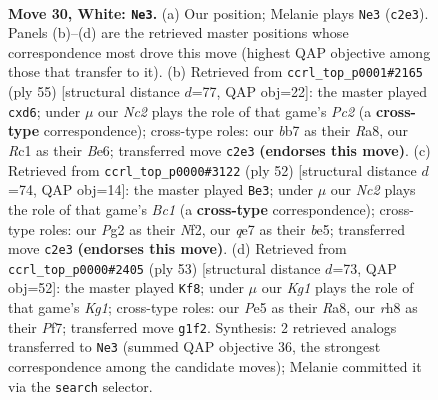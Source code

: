 \documentclass[11pt]{article}
\begin{document}
\clearpage

\begin{figure}[p]\centering
\begin{subfigure}{0.46\textwidth}\centering
\resizebox{\linewidth}{!}{%
\newchessgame
\chessboard[
  setfen={r2k2nr/1b2q3/8/4Pp2/5Q1p/1p1B3P/2N3P1/2R3KR w - - 0 30},
  showmover=false,
  pgfstyle=straightmove, color=movearrow, markmove={c2-e3}
]}
\caption{}
\end{subfigure}\hfill
\begin{subfigure}{0.46\textwidth}\centering
\resizebox{\linewidth}{!}{%
\newchessgame
\chessboard[
  setfen={r4rk1/1pp5/3Pb1p1/1P3nq1/P7/4P2R/1B4B1/1R1Q2K1 b - - 2 28},
  showmover=false,
  pgfstyle=straightmove, color=movearrow, markmove={c7-d6}
]}
\caption{}
\end{subfigure}
\\[4pt]
\begin{subfigure}{0.46\textwidth}\centering
\resizebox{\linewidth}{!}{%
\newchessgame
\chessboard[
  setfen={2b2rk1/3q4/2p3p1/3pb2n/8/2P3P1/Q4NBP/2B2RK1 w - - 0 27},
  showmover=false,
  pgfstyle=straightmove, color=movearrow, markmove={c1-e3}
]}
\caption{}
\end{subfigure}\hfill
\begin{subfigure}{0.46\textwidth}\centering
\resizebox{\linewidth}{!}{%
\newchessgame
\chessboard[
  setfen={r1r3k1/5pp1/3R1b2/qB2pP2/P7/7P/1P4Q1/5R1K b - - 1 27},
  showmover=false,
  pgfstyle=straightmove, color=movearrow, markmove={g8-f8}
]}
\caption{}
\end{subfigure}
\caption{\textbf{Move 30, White: \texttt{Ne3}.} (a) Our position; Melanie plays \texttt{Ne3} (\texttt{c2e3}). Panels (b)--(d) are the retrieved master positions whose correspondence most drove this move (highest QAP objective among those that transfer to it). (b) Retrieved from \texttt{ccrl\_top\_p0001\#2165} (ply 55) [structural distance $d$=77, QAP obj=22]: the master played \texttt{cxd6}; under $\mu$ our \emph{Nc2} plays the role of that game's \emph{Pc2} (a \textbf{cross-type} correspondence); cross-type roles: our \emph{b}b7 as their \emph{R}a8, our \emph{R}c1 as their \emph{B}e6; transferred move \texttt{c2e3} \textbf{(endorses this move)}. (c) Retrieved from \texttt{ccrl\_top\_p0000\#3122} (ply 52) [structural distance $d$=74, QAP obj=14]: the master played \texttt{Be3}; under $\mu$ our \emph{Nc2} plays the role of that game's \emph{Bc1} (a \textbf{cross-type} correspondence); cross-type roles: our \emph{P}g2 as their \emph{N}f2, our \emph{q}e7 as their \emph{b}e5; transferred move \texttt{c2e3} \textbf{(endorses this move)}. (d) Retrieved from \texttt{ccrl\_top\_p0000\#2405} (ply 53) [structural distance $d$=73, QAP obj=52]: the master played \texttt{Kf8}; under $\mu$ our \emph{Kg1} plays the role of that game's \emph{Kg1}; cross-type roles: our \emph{P}e5 as their \emph{R}a8, our \emph{r}h8 as their \emph{P}f7; transferred move \texttt{g1f2}. Synthesis: 2 retrieved analogs transferred to \texttt{Ne3} (summed QAP objective 36, the strongest correspondence among the candidate moves); Melanie committed it via the \texttt{search} selector.}
\label{fig:thought-m58}
\end{figure}
\end{document}
